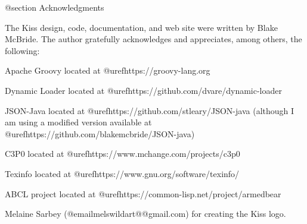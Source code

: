@section Acknowledgments

The Kiss design, code, documentation, and web site were written by
Blake McBride.  The author gratefully acknowledges and appreciates,
among others, the following:


Apache Groovy located at @uref{https://groovy-lang.org}

Dynamic Loader located at @uref{https://github.com/dvare/dynamic-loader}

JSON-Java located at @uref{https://github.com/stleary/JSON-java}
(although I am using a modified version available at
@uref{https://github.com/blakemcbride/JSON-java})

C3P0 located at @uref{https://www.mchange.com/projects/c3p0}

Texinfo located at @uref{https://www.gnu.org/software/texinfo/}

ABCL project located at @uref{https://common-lisp.net/project/armedbear}

Melaine Sarbey (@email{melswildart@@gmail.com}) for creating the Kiss logo.

